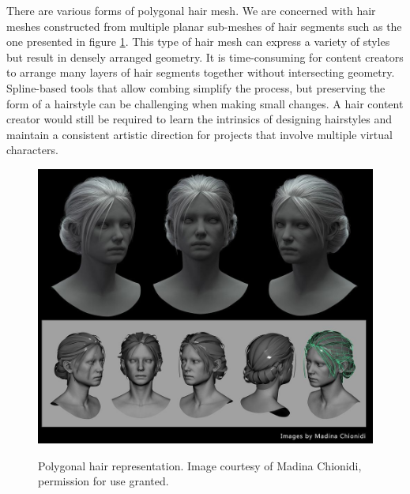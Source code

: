 \documentclass[ %
author={Dillon Keith Diep},
supervisor={Dr. Carl Henrik Ek},
degree={MEng},
title={ART-CG Hair:},
subtitle={Assisted Real-time Content Generation of Stylised Virtual Hair},
type={Research},
year={2017} ]{dissertation}
\begin{document}
There are various forms of polygonal hair mesh. We are concerned with hair meshes constructed from multiple planar sub-meshes of hair segments such as the one presented in figure \ref{hairExemplar}. This type of hair mesh can express a variety of styles but result in densely arranged geometry. It is time-consuming for content creators to arrange many layers of hair segments together without intersecting geometry. Spline-based tools that allow combing simplify the process, but preserving the form of a hairstyle can be challenging when making small changes. A hair content creator would still be required to learn the intrinsics of designing hairstyles and maintain a consistent artistic direction for projects that involve multiple virtual characters.

\begin{figure}[!h]
	\centering
	\caption{Polygonal hair representation. Image courtesy of Madina Chionidi, permission for use granted.}
	\includegraphics[scale=0.3]{images/hairExemplar}\\
	\label{hairExemplar}
\end{figure}
\end{document}
